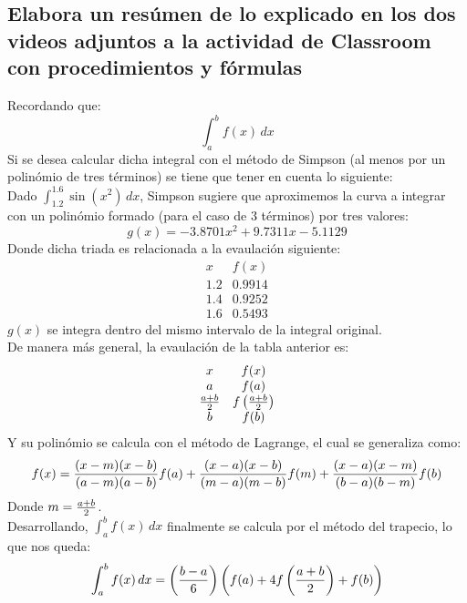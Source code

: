 \documentclass[letterpaper, 12pt]{article}
\begin{document}
\thispagestyle{fancy}
\subsection*{Elabora un resúmen de lo explicado en los dos videos adjuntos a la actividad de Classroom con procedimientos y fórmulas}
\justify
Recordando que:
{\large \[\int_a^b f(x)\, dx\]}
\justify
Si se desea calcular dicha integral con el método de Simpson (al menos por un polinómio de tres términos) se tiene que tener en cuenta lo siguiente:
\\\newline
Dado \(\int_{1.2}^{1.6} \sin \left(x^2\right)\, dx\), Simpson sugiere que aproximemos la curva a integrar con un polinómio formado (para el caso de 3 términos)
por tres valores:
{\large \[g(x)=-3.8701x^2+9.7311x-5.1129\]}
Donde dicha triada es relacionada a la evaulación siguiente:
{\large \[\begin{matrix}
    x & f(x) \\
    1.2 & 0.9914\\
    1.4 & 0.9252\\
    1.6 & 0.5493
\end{matrix}\]}
\justify
\(g(x)\) se integra dentro del mismo intervalo de la integral original.
\\\newline
De manera más general, la evaulación de la tabla anterior es:
{\large\[\begin{matrix}
    x & f(x) \\
    a & f(a) \\
    {a+b\over 2} & f\left({a+b\over 2}\right)\\
    b & f(b)
\end{matrix}\]}
\justify
Y su polinómio se calcula con el método de Lagrange, el cual se generaliza como:
{\large \[f(x)={(x-m)(x-b)\over (a-m)(a-b)}f(a)+{(x-a)(x-b)\over (m-a)(m-b)}f(m)+{(x-a)(x-m)\over (b-a)(b-m)}f(b)\]}
\justify
Donde \(m={a+b\over 2}\).
\\\newline
Desarrollando, \(\int_a^b f(x)\, dx\) finalmente se calcula por el método del trapecio, lo que nos queda:
{\large \[\int_a^b f(x)\, dx=\left({b-a\over 6}\right)\left(f(a)+4f\left({a+b\over 2}\right)+f(b)\right)\]}
\end{document}
